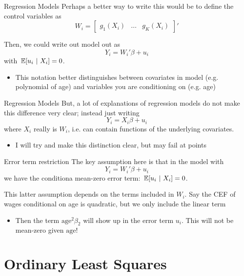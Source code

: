 \documentclass[aspectratio=169,t,11pt,table]{beamer}
\begin{document}
\begin{frame}{Regression Models}
  Perhaps a better way to write this would be to define the control variables as
  $$
    W_i = \begin{bmatrix}
      g_1(X_i) &
      \dots &
      g_K(X_i)
    \end{bmatrix}'
  $$

  Then, we could write out model out as
  $$
    Y_i = W_i' \beta + u_i
  $$
  with $\expec{u_i}{X_i} = 0$.
  \begin{itemize}
    \item This notation better distinguishes between covariates in model (e.g. polynomial of age) and variables you are conditioning on (e.g. age)
  \end{itemize}
\end{frame}

\begin{frame}{Regression Models}
  But, a lot of explanations of regression models do not make this difference very clear; instead just writing 
  $$
    Y_i = X_i \beta + u_i
  $$
  where $X_i$ really is $W_i$, i.e. can contain functions of the underlying covariates. 

  \begin{itemize}
    \item I will try and make this distinction clear, but may fail at points
  \end{itemize}
\end{frame}

\begin{frame}{Error term restriction}
  The key assumption here is that in the model with 
  $$
    Y_i = W_i' \beta + u_i
  $$
  we have the conditiona mean-zero error term: $\expec{u_i}{X_i} = 0$.

  \bigskip
  This latter assumption depends on the terms included in $W_i$. Say the CEF of wages conditional on age is quadratic, but we only include the linear term
  \begin{itemize}
    \item Then the term $\text{age}^2 \beta_2$ will show up in the error term $u_i$. This will not be mean-zero given $\text{age}$!
  \end{itemize}
\end{frame}

\section{Ordinary Least Squares}
\end{document}
